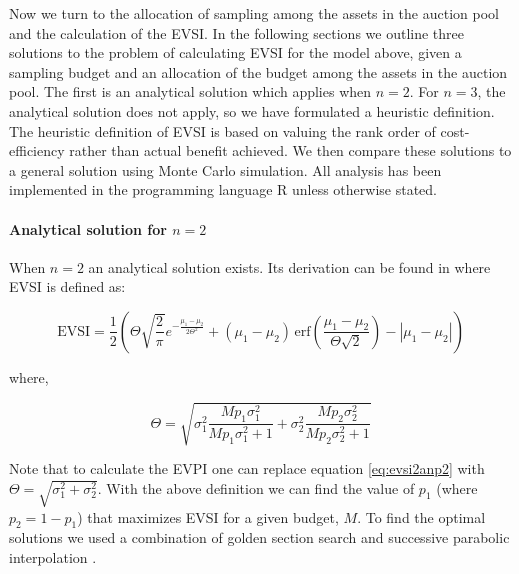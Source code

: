 \documentclass[]{article}
\theoremstyle{definition}
\theoremstyle{definition}
\theoremstyle{remark}
\begin{document}
Now we turn to the allocation of sampling among the assets in the
auction pool and the calculation of the EVSI. In the following sections
we outline three solutions to the problem of calculating EVSI for the
model above, given a sampling budget and an allocation of the budget
among the assets in the auction pool. The first is an analytical
solution which applies when \(n = 2\). For \(n = 3\), the analytical
solution does not apply, so we have formulated a heuristic definition.
The heuristic definition of EVSI is based on valuing the rank order of
cost-efficiency rather than actual benefit achieved. We then compare
these solutions to a general solution using Monte Carlo simulation. All
analysis has been implemented in the programming language R
\citep{R2017} unless otherwise stated.

\paragraph*{\texorpdfstring{Analytical solution for
\(n = 2\)}{Analytical solution for n = 2}}\label{analytical-solution-for-n-2}

When \(n = 2\) an analytical solution exists. Its derivation can be
found in \citet{Moore2017} where EVSI is defined as:

\begin{equation}
\mathrm{EVSI} = \frac{1}{2}\left(\Theta\sqrt{\frac{2}{\pi}}e^{-\frac{\mu_1 - \mu_2}{2\Theta^2}} + (\mu_1 - \mu_2)\,\mathrm{erf}\left(\frac{\mu_1 - \mu_2}{\Theta\sqrt{2}}\right) - |\mu_1 - \mu_2|\right)
\label{eq:evsi2anp1}
\end{equation}

\clearpage

where,

\begin{equation}
\Theta = \sqrt{\sigma^2_1\frac{Mp_1\sigma^2_1}{Mp_1\sigma^2_1 + 1} + \sigma^2_2\frac{Mp_2\sigma^2_2}{Mp_2\sigma^2_2 + 1}}
\label{eq:evsi2anp2}
\end{equation}

Note that to calculate the EVPI one can replace equation
\eqref{eq:evsi2anp2} with \(\Theta = \sqrt{\sigma^2_1 + \sigma^2_2}\).
With the above definition we can find the value of \(p_1\) (where
\(p_2 = 1 - p_1\)) that maximizes EVSI for a given budget, \(M\). To
find the optimal solutions we used a combination of golden section
search and successive parabolic interpolation \citep[as implemented
in][]{Forsythe1977}.
\end{document}

